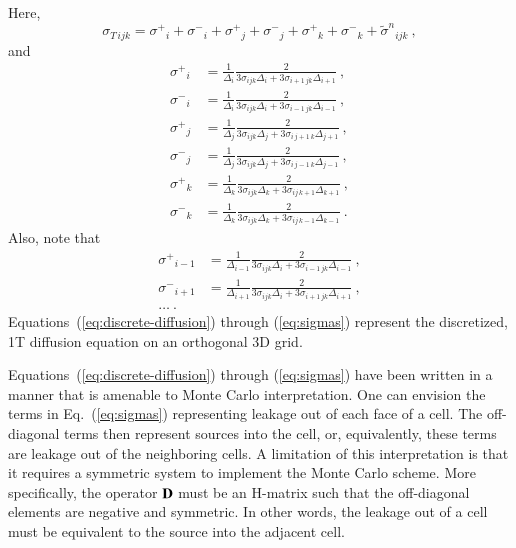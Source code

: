 \documentclass[preprint,12pt]{elsarticle}
\newcommand{\sign}{\ensuremath{\tilde{\sigma}^n}}
\newcommand{\Di}{\ensuremath{\Delta_i}}
\newcommand{\Dj}{\ensuremath{\Delta_j}}
\newcommand{\Dk}{\ensuremath{\Delta_k}}
\newcommand{\sigT}{\ensuremath{\sigma_{T\,ijk}}}
\newcommand{\sigm}{\ensuremath{\sigma^{-}}}
\newcommand{\sigp}{\ensuremath{\sigma^{+}}}
\begin{document}
Here,
\begin{equation}
  \sigT = \sigp_i + \sigm_i + \sigp_j + \sigm_j + \sigp_k + \sigm_k
  + \sign_{ijk}\:,
\end{equation}
and
\begin{subequations}
  \begin{align}
    \sigp_{i} &= \frac{1}{\Di}\frac{2}{3\sigma_{ijk}\Di
      + 3\sigma_{i+1\,jk}\Delta_{i+1}}\:,\\
    \sigm_{i} &= \frac{1}{\Di}\frac{2}{3\sigma_{ijk}\Di
      + 3\sigma_{i-1\,jk}\Delta_{i-1}}\:,\\
    \sigp_{j} &= \frac{1}{\Dj}\frac{2}{3\sigma_{ijk}\Dj
      + 3\sigma_{i\,j+1\,k}\Delta_{j+1}}\:,\\
    \sigm_{j} &= \frac{1}{\Dj}\frac{2}{3\sigma_{ijk}\Dj
      + 3\sigma_{i\,j-1\,k}\Delta_{j-1}}\:,\\
    \sigp_{k} &= \frac{1}{\Dk}\frac{2}{3\sigma_{ijk}\Dk
      + 3\sigma_{ij\,k+1}\Delta_{k+1}}\:,\\
    \sigm_{k} &= \frac{1}{\Dk}\frac{2}{3\sigma_{ijk}\Dk
      + 3\sigma_{ij\,k-1}\Delta_{k-1}}\:. 
  \end{align}
  \label{eq:sigmas}
\end{subequations}
Also, note that
\begin{align*}
  \sigp_{i-1} &= \frac{1}{\Delta_{i-1}}\frac{2}{3\sigma_{ijk}\Di
    + 3\sigma_{i-1\,jk}\Delta_{i-1}}\:,\\
  \sigm_{i+1} &= \frac{1}{\Delta_{i+1}}\frac{2}{3\sigma_{ijk}\Di
    + 3\sigma_{i+1\,jk}\Delta_{i+1}}\:,\\
  \ldots\:.
\end{align*}
Equations~(\ref{eq:discrete-diffusion}) through (\ref{eq:sigmas})
represent the discretized, 1T diffusion equation on an orthogonal
3D grid. 

Equations~(\ref{eq:discrete-diffusion}) through (\ref{eq:sigmas}) have
been written in a manner that is amenable to Monte Carlo
interpretation.  One can envision the terms in Eq.~(\ref{eq:sigmas})
representing leakage out of each face of a cell.  The off-diagonal
terms then represent sources into the cell, or, equivalently, these
terms are leakage out of the neighboring cells.  A limitation of this
interpretation is that it requires a symmetric system to implement the
Monte Carlo scheme.  More specifically, the operator $\mathbf{D}$ must be
an H-matrix \cite{kelley_1995} such that the off-diagonal elements are
negative and symmetric.  In other words, the leakage out of a cell
must be equivalent to the source into the adjacent cell.
\end{document}
